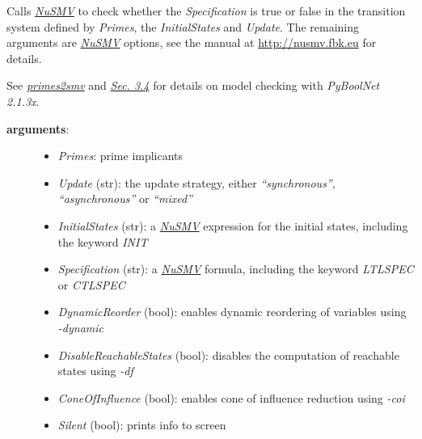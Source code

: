 \documentclass[letterpaper,10pt,english]{sphinxmanual}
\begin{document}
\begin{fulllineitems}
\label{ModelChecking:PyBoolNet.ModelChecking.check_primes}
Calls {\hyperref[Installation:installation-nusmv]{\emph{NuSMV}}} to check whether the \emph{Specification} is true or false in the transition system defined by \emph{Primes},
the \emph{InitialStates} and \emph{Update}.
The remaining arguments are {\hyperref[Installation:installation-nusmv]{\emph{NuSMV}}} options, see the manual at \href{http://nusmv.fbk.eu}{http://nusmv.fbk.eu} for details.

See {\hyperref[ModelChecking:primes2smv]{\emph{primes2smv}}} and {\hyperref[Manual:sec-model-checking]{\emph{Sec. 3.4}}} for details on model checking with \emph{PyBoolNet 2.1.3x}.
\begin{description}
\item[{\textbf{arguments}:}] \leavevmode\begin{itemize}
\item {} 
\emph{Primes}: prime implicants

\item {} 
\emph{Update} (str): the update strategy, either \emph{``synchronous''}, \emph{``asynchronous''} or \emph{``mixed''}

\item {} 
\emph{InitialStates} (str): a {\hyperref[Installation:installation-nusmv]{\emph{NuSMV}}} expression for the initial states, including the keyword \emph{INIT}

\item {} 
\emph{Specification} (str): a {\hyperref[Installation:installation-nusmv]{\emph{NuSMV}}} formula, including the keyword \emph{LTLSPEC} or \emph{CTLSPEC}

\item {} 
\emph{DynamicReorder} (bool): enables dynamic reordering of variables using \emph{-dynamic}

\item {} 
\emph{DisableReachableStates} (bool): disables the computation of reachable states using \emph{-df}

\item {} 
\emph{ConeOfInfluence} (bool): enables cone of influence reduction using \emph{-coi}

\item {} 
\emph{Silent} (bool): prints info to screen


\end{itemize}
\end{description}
\end{fulllineitems}
\end{document}
